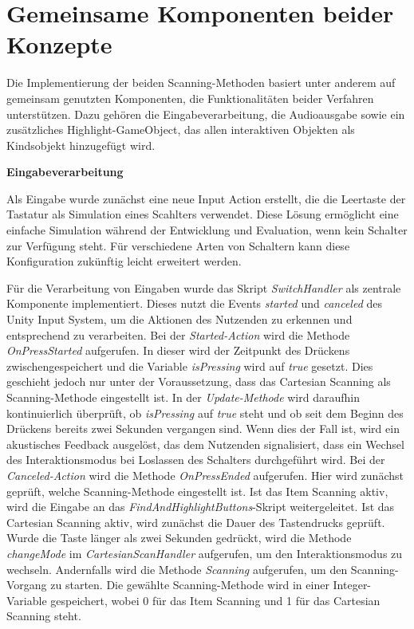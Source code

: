 \section {Gemeinsame Komponenten beider Konzepte}

Die Implementierung der beiden Scanning-Methoden basiert unter anderem auf gemeinsam genutzten Komponenten, die Funktionalitäten beider Verfahren unterstützen. Dazu gehören die Eingabeverarbeitung, die Audioausgabe sowie ein zusätzliches Highlight-GameObject, das allen interaktiven Objekten als Kindsobjekt hinzugefügt wird. 

{\normalfont \bfseries Eingabeverarbeitung}

Als Eingabe wurde zunächst eine neue Input Action erstellt, die die Leertaste der Tastatur als Simulation eines Scahlters verwendet. Diese Lösung ermöglicht eine einfache Simulation während der Entwicklung und Evaluation, wenn kein Schalter zur Verfügung steht. Für verschiedene Arten von Schaltern kann diese Konfiguration zukünftig leicht erweitert werden.

Für die Verarbeitung von Eingaben wurde das Skript \textit{SwitchHandler} als zentrale Komponente implementiert. Dieses nutzt die Events \textit{started} und \textit{canceled} des Unity Input System, um die Aktionen des Nutzenden zu erkennen und entsprechend zu verarbeiten. Bei der \textit{Started-Action} wird die Methode \textit{OnPressStarted} aufgerufen. In dieser wird der Zeitpunkt des Drückens zwischengespeichert und die Variable \textit{isPressing} wird auf \textit{true} gesetzt. Dies geschieht jedoch nur unter der Voraussetzung, dass das Cartesian Scanning als Scanning-Methode eingestellt ist. In der \textit{Update-Methode} wird daraufhin kontinuierlich überprüft, ob \textit{isPressing} auf \textit{true} steht und ob seit dem Beginn des Drückens bereits zwei Sekunden vergangen sind. Wenn dies der Fall ist, wird ein akustisches Feedback ausgelöst, das dem Nutzenden signalisiert, dass ein Wechsel des Interaktionsmodus bei Loslassen des Schalters durchgeführt wird.
Bei der \textit{Canceled-Action} wird die Methode \textit{OnPressEnded} aufgerufen. Hier wird zunächst geprüft, welche Scanning-Methode eingestellt ist. Ist das Item Scanning aktiv, wird die Eingabe an das \textit{FindAndHighlightButtons}-Skript weitergeleitet. Ist das Cartesian Scanning aktiv, wird zunächst die Dauer des Tastendrucks geprüft. Wurde die Taste länger als zwei Sekunden gedrückt, wird die Methode \textit{changeMode} im \textit{CartesianScanHandler} aufgerufen, um den Interaktionsmodus zu wechseln. Andernfalls wird die Methode \textit{Scanning} aufgerufen, um den Scanning-Vorgang zu starten. Die gewählte Scanning-Methode wird in einer Integer-Variable gespeichert, wobei 0 für das Item Scanning und 1 für das Cartesian Scanning steht. 

